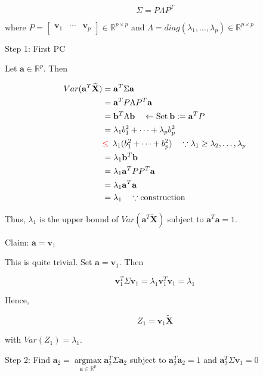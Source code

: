\documentclass[]{book}
\DeclareMathOperator*{\argmax}{argmax}
\theoremstyle{definition}
\theoremstyle{definition}
\theoremstyle{definition}
\theoremstyle{remark}
\begin{document}
\[\Sigma = P \Lambda P^T\]

where \(P = \begin{bmatrix} \mathbf{v}_1 & \cdots & \mathbf{v}_p \end{bmatrix} \in \mathbb{R}^{p \times p}\) and \(\Lambda = diag(\lambda_1, \ldots, \lambda_p) \in \mathbb{R}^{p \times p}\)

Step 1: First PC

Let \(\mathbf{a} \in \mathbb{R}^p\). Then

\begin{equation*}
  \begin{split}
    Var(\mathbf{a}^T \widetilde{\mathbf{X}}) & = \mathbf{a}^T \Sigma \mathbf{a} \\
    & = \mathbf{a}^T P\Lambda P^T \mathbf{a} \\
    & = \mathbf{b}^T \Lambda \mathbf{b} \quad \leftarrow \text{Set}\: \mathbf{b} := \mathbf{a}^T P \\
    & = \lambda_1 b_1^2 + \cdots + \lambda_p b_p^2 \\
    & {\color{red}{\le}} \:\: \lambda_1 (b_1^2 + \cdots + b_p^2) \quad \because \lambda_1 \ge \lambda_2, \ldots, \lambda_p \\
    & = \lambda_1 \mathbf{b}^T \mathbf{b} \\
    & = \lambda_1 \mathbf{a}^T P P^T \mathbf{a} \\
    & = \lambda_1 \mathbf{a}^T \mathbf{a} \\
    & = \lambda_1 \quad \because \text{construction}
  \end{split}
\end{equation*}

Thus, \(\lambda_1\) is the upper bound of \(Var(\mathbf{a}^T \widetilde{\mathbf{X}})\) subject to \(\mathbf{a}^T \mathbf{a} = 1\).

Claim: \(\mathbf{a} = \mathbf{v}_1\)

This is quite trivial. Set \(\mathbf{a} = \mathbf{v}_1\). Then

\[\mathbf{v}_1^T \Sigma \mathbf{v}_1 = \lambda_1 \mathbf{v}_1^T\mathbf{v}_1 = \lambda_1\]

Hence,

\[Z_1 = \mathbf{v}_1 \widetilde{\mathbf{X}}\]

with \(Var(Z_1) = \lambda_1\).

Step 2: Find \(\mathbf{a}_2 = \argmax\limits_{\mathbf{a} \in \mathbb{R}^p} \mathbf{a}_2^T \Sigma \mathbf{a}_2\) subject to \(\mathbf{a}_2^T \mathbf{a}_2 = 1\) and \(\mathbf{a}_2^T \Sigma \mathbf{v}_1 = 0\)
\end{document}

